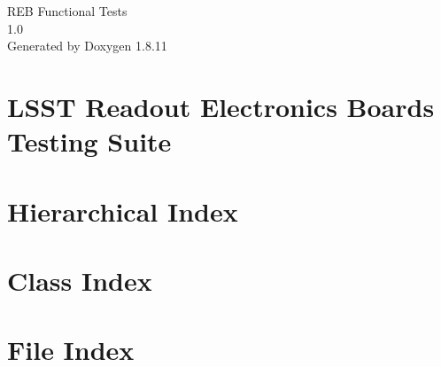 \documentclass[twoside]{book}
\newcommand{\+}{\discretionary{\mbox{\scriptsize$\hookleftarrow$}}{}{}}
\newcommand{\clearemptydoublepage}{%
  \newpage{\pagestyle{empty}\cleardoublepage}%
}
\begin{document}
\hypersetup{pageanchor=false,
             bookmarksnumbered=true,
             pdfencoding=unicode
            }
\begin{titlepage}
\vspace*{7cm}
\begin{center}%
{\Large R\+EB Functional Tests \\[1ex]\large 1.\+0 }\\
\vspace*{1cm}
{\large Generated by Doxygen 1.8.11}\\
\end{center}
\end{titlepage}
\clearemptydoublepage
\tableofcontents
\clearemptydoublepage
{}
\hypersetup{pageanchor=true}

\chapter{L\+S\+ST Readout Electronics Boards Testing Suite}
\label{index}\hypertarget{index}{}
\chapter{Hierarchical Index}

\chapter{Class Index}

\chapter{File Index}

\end{document}
